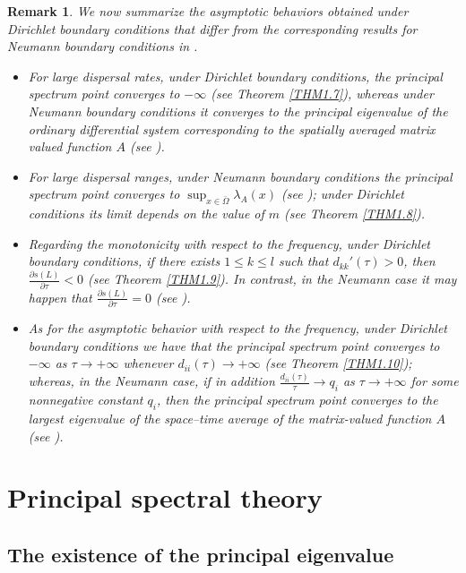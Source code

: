 \documentclass[11pt,reqno]{amsart}
\newtheorem{remark}[theorem]{Remark}
\numberwithin{equation}{section}
\begin{document}
\begin{remark}{\rm
We now summarize the asymptotic behaviors obtained under Dirichlet boundary conditions that differ from the corresponding results for Neumann boundary conditions in \cite{Feng}.
\begin{itemize}[leftmargin=0.78cm]
\item[(i)] For large dispersal rates, under Dirichlet boundary conditions, the principal spectrum point converges to $-\infty$ (see Theorem \ref{THM1.7}), whereas under Neumann boundary conditions it converges to the principal eigenvalue of the ordinary differential system corresponding to the spatially averaged matrix valued function $A$ (see \cite[Theorem 4.1 (i)]{Feng}).

\item[(ii)] For large dispersal ranges, under Neumann boundary conditions the principal spectrum point converges to $\sup_{x\in\bar{\Omega}} \lambda_{A}(x)$ (see \cite[Theorem 4.2 (i)]{Feng}); under Dirichlet conditions its limit depends on the value of
$m$ (see Theorem \ref{THM1.8}).

\item[(iii)]  Regarding the monotonicity with respect to the frequency, under Dirichlet boundary conditions, if there exists $1 \le k \le l$ such that $d_{kk}'(\tau) > 0$, then $\frac{\partial s(L)}{\partial \tau} < 0$ (see Theorem \ref{THM1.9}). In contrast, in the Neumann case it may happen that $\frac{\partial s(L)}{\partial \tau} = 0$ (see \cite[Theorem 3.2 (i)]{Feng}).

\item[(iv)]  As for the asymptotic behavior with respect to the frequency, under Dirichlet boundary conditions we have that the principal spectrum point converges to $-\infty$ as $\tau\to+\infty$ whenever $d_{ii}(\tau)\to +\infty$ (see Theorem \ref{THM1.10}); whereas, in the Neumann case, if in addition $\frac{d_{ii}(\tau)}{\tau} \to q_{i}$ as $\tau\to+\infty$  for some nonnegative constant $q_{i}$, then the principal spectrum point converges to the largest eigenvalue of the space--time average of the matrix-valued function $A$ (see \cite[Theorem 3.6 (ii)]{Feng}).
\end{itemize}
}
\end{remark}


\section{Principal spectral theory}
\subsection{The existence of the principal eigenvalue}
\indent
\end{document}
